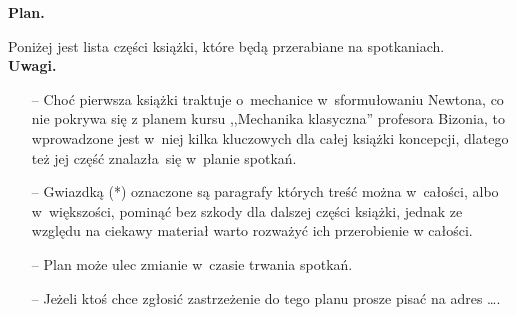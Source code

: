 \documentclass[a4paper,11pt]{article}
\begin{document}
\begin{center}
\Large{\textbf{Plan.}} \\
\end{center}
\noindent
Poniżej jest lista części książki, które będą przerabiane na spotkaniach. \\ \newline
\noindent
\textbf{Uwagi.}
\begin{itemize}
\item[--] Choć pierwsza książki traktuje o~mechanice w~sformułowaniu Newtona, co nie pokrywa się z planem kursu ,,Mechanika klasyczna'' profesora Bizonia, to wprowadzone jest w~niej kilka kluczowych dla całej książki koncepcji, dlatego też jej część znalazła~się w~planie spotkań.
\item[--] Gwiazdką (*) oznaczone są paragrafy których treść można w~całości, albo w~większości, pominąć bez szkody dla dalszej części książki, jednak ze względu na ciekawy materiał warto rozważyć ich przerobienie w całości.
\item[--] Plan może ulec zmianie w~czasie trwania spotkań.
\item[--] Jeżeli ktoś chce zgłosić zastrzeżenie do tego planu prosze pisać na adres \ldots .
\end{itemize}
\end{document}
